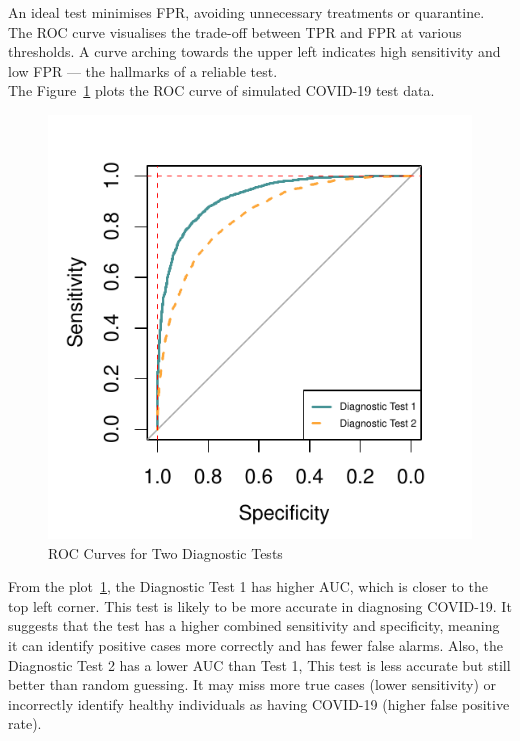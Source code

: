 \documentclass{article}\usepackage[]{graphicx}\usepackage[]{xcolor}
\makeatletter
\def\maxwidth{ %
  \ifdim\Gin@nat@width>\linewidth
    \linewidth
  \else
    \Gin@nat@width
  \fi
}
\newenvironment{knitrout}{}{} %
\numberwithin{equation}{section}
\makeatother
\begin{document}
\noindent
An ideal test minimises FPR, avoiding unnecessary treatments or quarantine. The ROC curve visualises the trade-off between TPR and FPR at various thresholds. A curve arching towards the upper left indicates high sensitivity and low FPR — the hallmarks of a reliable test.\\

\noindent
The Figure~\ref{fig:roc} plots the ROC curve of simulated COVID-19 test data. 



\begin{knitrout}\scriptsize
{}\color{fgcolor}\begin{figure}[H]

{\centering \includegraphics[width=\maxwidth]{figure/beamer-roc-1} 

}

\caption[ROC Curves for Two Diagnostic Tests]{ROC Curves for Two Diagnostic Tests}\label{fig:roc}
\end{figure}

\end{knitrout}

\noindent
From the plot~\ref{fig:roc}, the Diagnostic Test 1 has higher AUC, which is closer to the top left corner. This test is likely to be more accurate in diagnosing COVID-19. It suggests that the test has a higher combined sensitivity and specificity, meaning it can identify positive cases more correctly and has fewer false alarms. Also, the Diagnostic Test 2 has a lower AUC than Test 1, This test is less accurate but still better than random guessing. It may miss more true cases (lower sensitivity) or incorrectly identify healthy individuals as having COVID-19 (higher false positive rate).
\end{document}
